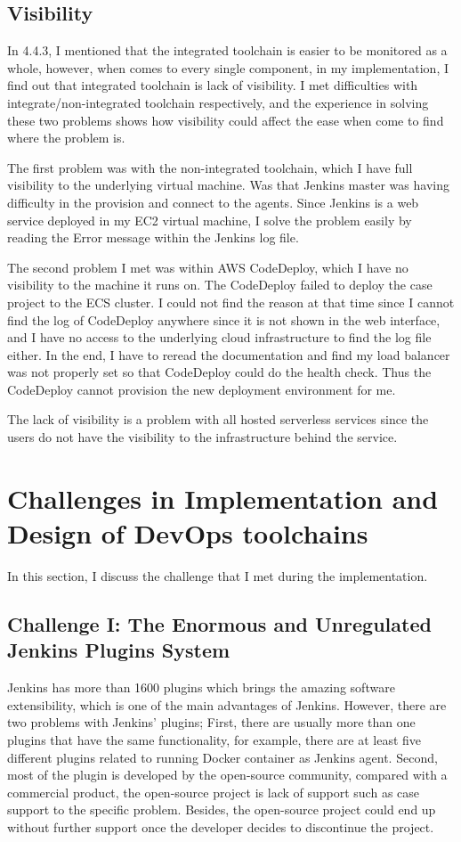 \subsection{Visibility}
\label{visibility}
In 4.4.3, I mentioned that the integrated toolchain is easier to be monitored as a whole, however, when comes to every single component, in my implementation, I find out that integrated toolchain is lack of visibility. I met difficulties with integrate/non-integrated toolchain respectively, and the experience in solving these two problems shows how visibility could affect the ease when come to find where the problem is.
\par
The first problem was with the non-integrated toolchain, which I have full visibility to the underlying virtual machine. Was that Jenkins master was having difficulty in the provision and connect to the agents. Since Jenkins is a web service deployed in my EC2 virtual machine, I solve the problem easily by reading the Error message within the Jenkins log file.
\par
The second problem I met was within AWS CodeDeploy, which I have no visibility to the machine it runs on. The CodeDeploy failed to deploy the case project to the ECS cluster. I could not find the reason at that time since I cannot find the log of CodeDeploy anywhere since it is not shown in the web interface, and I have no access to the underlying cloud infrastructure to find the log file either. In the end, I have to reread the documentation and find my load balancer was not properly set so that CodeDeploy could do the health check. Thus the CodeDeploy cannot provision the new deployment environment for me.
\par
The lack of visibility is a problem with all hosted serverless services since the users do not have the visibility to the infrastructure behind the service.
\section{Challenges in Implementation and Design of DevOps toolchains}
In this section, I discuss the challenge that I met during the implementation. 
\subsection{Challenge I: The Enormous and Unregulated Jenkins Plugins System}
Jenkins has more than 1600 plugins which brings the amazing software extensibility, which is one of the main advantages of Jenkins. However, there are two problems with Jenkins' plugins; First, there are usually more than one plugins that have the same functionality, for example, there are at least five different plugins related to running Docker container as Jenkins agent. Second, most of the plugin is developed by the open-source community, compared with a commercial product, the open-source project is lack of support such as case support to the specific problem. Besides, the open-source project could end up without further support once the developer decides to discontinue the project.


